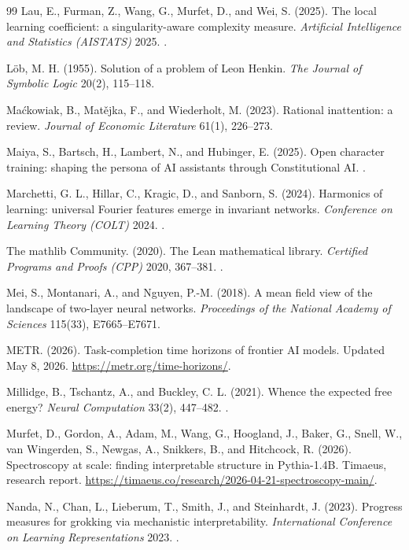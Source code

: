 \begin{thebibliography}{99}
 Lau, E., Furman, Z., Wang, G., Murfet, D., and Wei, S. (2025). The local learning coefficient: a singularity-aware complexity measure. \emph{Artificial Intelligence and Statistics (AISTATS)} 2025. .


 L\"ob, M. H. (1955). Solution of a problem of Leon Henkin. \emph{The Journal of Symbolic Logic} 20(2), 115--118.



 Ma\'ckowiak, B., Mat\v{e}jka, F., and Wiederholt, M. (2023). Rational inattention: a review. \emph{Journal of Economic Literature} 61(1), 226--273.

 Maiya, S., Bartsch, H., Lambert, N., and Hubinger, E. (2025). Open character training: shaping the persona of AI assistants through Constitutional AI. .

 Marchetti, G. L., Hillar, C., Kragic, D., and Sanborn, S. (2024). Harmonics of learning: universal Fourier features emerge in invariant networks. \emph{Conference on Learning Theory (COLT)} 2024. .

 The mathlib Community. (2020). The Lean mathematical library. \emph{Certified Programs and Proofs (CPP)} 2020, 367--381. .

 Mei, S., Montanari, A., and Nguyen, P.-M. (2018). A mean field view of the landscape of two-layer neural networks. \emph{Proceedings of the National Academy of Sciences} 115(33), E7665--E7671.

 METR. (2026). Task-completion time horizons of frontier AI models. Updated May 8, 2026. \url{https://metr.org/time-horizons/}.

 Millidge, B., Tschantz, A., and Buckley, C. L. (2021). Whence the expected free energy? \emph{Neural Computation} 33(2), 447--482. .

 Murfet, D., Gordon, A., Adam, M., Wang, G., Hoogland, J., Baker, G., Snell, W., van Wingerden, S., Newgas, A., Snikkers, B., and Hitchcock, R. (2026). Spectroscopy at scale: finding interpretable structure in Pythia-1.4B. Timaeus, research report. \url{https://timaeus.co/research/2026-04-21-spectroscopy-main/}.

 Nanda, N., Chan, L., Lieberum, T., Smith, J., and Steinhardt, J. (2023). Progress measures for grokking via mechanistic interpretability. \emph{International Conference on Learning Representations} 2023. .


\end{thebibliography}
